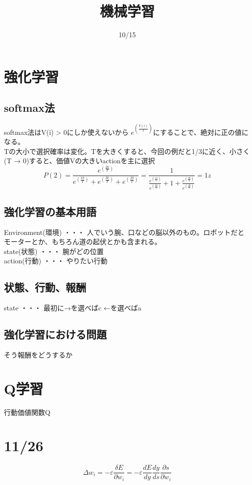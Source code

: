 \documentclass{jsarticle}
\title{機械学習}
\date{10/15}
\begin{document}
\maketitle

\section{強化学習}
	\subsection{softmax法}
		softmax法はV(i) > 0にしか使えないから $e^(\frac{V(i)}{T})$にすることで、絶対に正の値になる。\\
		Tの大小で選択確率は変化。Tを大きくすると、今回の例だと1/3に近く、小さく(T → 0)すると、価値Vの大きいactionを主に選択
		\begin{equation}
			P(2)=\frac{e^(\frac{20}{T})}{e^(\frac{10}{T})+e^(\frac{30}{T})+e^(\frac{20}{T})} 
			= \frac{1}{\frac{e^(\frac{10}{T})}{e^(\frac{30}{T})}+1+\frac{e^(\frac{20}{T})}{e^(\frac{30}{T})}} =1z
		\end{equation}
		
	\subsection{強化学習の基本用語}
		Environment(環境) ・・・ 人でいう腕、口などの脳以外のもの。ロボットだとモーターとか、もちろん道の起伏とかも含まれる。\\
		state(状態) ・・・ 腕がどの位置 \\
		action(行動) ・・・ やりたい行動 \\
	\subsection{状態、行動、報酬}
		state ・・・ 最初に→を選べばc  ←を選べばa
		
	\subsection{強化学習における問題}
		そう報酬をどうするか

\section{Q学習}
	行動価値関数Q
		                  
\section{11/26}
\begin{equation}
	\Delta w_i=-ε\frac{\delta E}{\partial w_i}=-ε\frac{dE}{dy}\frac{dy}{ds}\frac{\partial s}{\partial w_i}
\end{equation}		           
\end{document}
